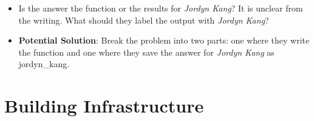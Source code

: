 \documentclass[
]{article}
\begin{document}
\begin{itemize}
\item
  Is the answer the function or the results for \emph{Jordyn Kang}? It
  is unclear from the writing. What should they label the output with
  \emph{Jordyn Kang}?
\item
  \textbf{Potential Solution}: Break the problem into two parts: one
  where they write the function and one where they save the answer for
  \emph{Jordyn Kang} as jordyn\_kang.
\end{itemize}

\hypertarget{building-infrastructure}{%
\section{Building Infrastructure}\label{building-infrastructure}}
\end{document}
